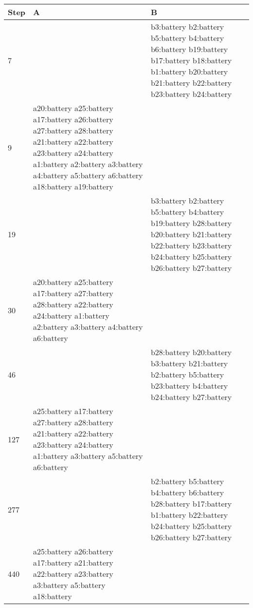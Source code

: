 \documentclass{article}
\begin{document}
\begin{tabularx}{\textwidth}{l|X|X|}
\hline
Step&A&B\\
\hline7&&b3:battery b2:battery b5:battery b4:battery b6:battery b19:battery b17:battery b18:battery b1:battery b20:battery b21:battery b22:battery b23:battery b24:battery \\\hline9&a20:battery a25:battery a17:battery a26:battery a27:battery a28:battery a21:battery a22:battery a23:battery a24:battery a1:battery a2:battery a3:battery a4:battery a5:battery a6:battery a18:battery a19:battery &\\\hline19&&b3:battery b2:battery b5:battery b4:battery b19:battery b28:battery b20:battery b21:battery b22:battery b23:battery b24:battery b25:battery b26:battery b27:battery \\\hline30&a20:battery a25:battery a17:battery a27:battery a28:battery a22:battery a24:battery a1:battery a2:battery a3:battery a4:battery a6:battery &\\\hline46&&b28:battery b20:battery b3:battery b21:battery b2:battery b5:battery b23:battery b4:battery b24:battery b27:battery \\\hline127&a25:battery a17:battery a27:battery a28:battery a21:battery a22:battery a23:battery a24:battery a1:battery a3:battery a5:battery a6:battery &\\\hline277&&b2:battery b5:battery b4:battery b6:battery b28:battery b17:battery b1:battery b22:battery b24:battery b25:battery b26:battery b27:battery \\\hline440&a25:battery a26:battery a17:battery a21:battery a22:battery a23:battery a3:battery a5:battery a18:battery &\\\hline
\end{tabularx}
\end{document}
